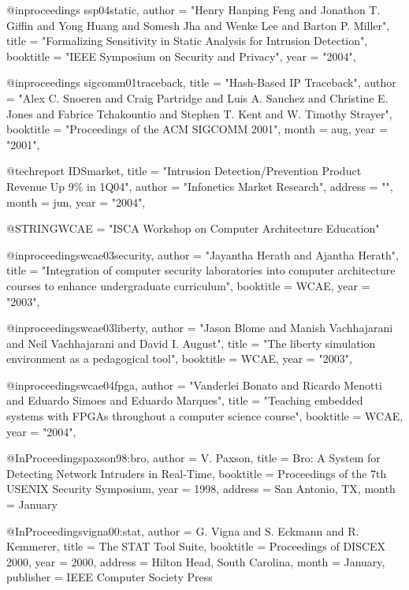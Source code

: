 @inproceedings{ ssp04static,
	author = "Henry Hanping Feng and Jonathon T. Giffin and Yong Huang and Somesh Jha and Wenke Lee and Barton P. Miller",
	title = "Formalizing Sensitivity in Static Analysis for Intrusion Detection",
	booktitle = "IEEE Symposium on Security and Privacy",
	year = "2004",
}

@inproceedings{ sigcomm01traceback,
	title = "Hash-Based IP Traceback",
	author = "Alex C. Snoeren and Craig Partridge and Luis A. Sanchez and Christine E. Jones and Fabrice Tchakountio and Stephen T. Kent and W. Timothy Strayer",
	booktitle = "Proceedings of the ACM SIGCOMM 2001",
	month = aug,
	year = "2001",
}

@techreport{ IDSmarket,
	title = "Intrusion Detection/Prevention Product Revenue Up 9\% in 1{Q}04",
	author = "Infonetics Market Research",
	address = "",
	month = jun,
	year = "2004",
}

@STRING{WCAE = "ISCA Workshop on Computer Architecture Education"}

@inproceedings{wcae03security,
    author = "Jayantha Herath and Ajantha Herath",
    title = "Integration of computer security laboratories into computer architecture courses to enhance undergraduate curriculum",
    booktitle = WCAE,
    year = "2003",
}

@inproceedings{wcae03liberty,
    author = "Jason Blome and Manish Vachhajarani and Neil Vachhajarani and David I. August",
    title = "The liberty simulation environment as a pedagogical tool",
    booktitle = WCAE,
    year = "2003",
}

@inproceedings{wcae04fpga,
    author = "Vanderlei Bonato and Ricardo Menotti and Eduardo Simoes and Eduardo Marques",
    title = "Teaching embedded systems with FPGAs throughout a computer science course",
    booktitle = WCAE,
    year = "2004",
}


@InProceedings{paxson98:bro,
  author =       {V. Paxson},
  title =        {{Bro: A System for Detecting Network Intruders in Real-Time}},
  booktitle =    {Proceedings of the 7th USENIX Security Symposium},
  year =         1998,
  address =      {San Antonio, TX},
  month =        {January}
}

@InProceedings{vigna00:stat, 
  author =       {G. Vigna and S. Eckmann and R. Kemmerer},
  title =        {{The STAT Tool Suite}},
  booktitle =    {Proceedings of DISCEX 2000},
  year =         2000,
  address =      {Hilton Head, South Carolina},
  month =        {January},
  publisher =    {IEEE Computer Society Press}
}



